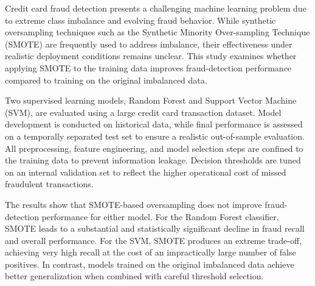 \documentclass[oneside,12pt,parskip=half,american,numbers=noenddot]{scrreprt}
\begin{document}
Credit card fraud detection presents a challenging machine learning problem due to extreme class imbalance and evolving fraud behavior. While synthetic oversampling techniques such as the Synthetic Minority Over-sampling Technique (SMOTE) are frequently used to address imbalance, their effectiveness under realistic deployment conditions remains unclear. This study examines whether applying SMOTE to the training data improves fraud-detection performance compared to training on the original imbalanced data.

Two supervised learning models, Random Forest and Support Vector Machine (SVM), are evaluated using a large credit card transaction dataset. Model development is conducted on historical data, while final performance is assessed on a temporally separated test set to ensure a realistic out-of-sample evaluation. All preprocessing, feature engineering, and model selection steps are confined to the training data to prevent information leakage. Decision thresholds are tuned on an internal validation set to reflect the higher operational cost of missed fraudulent transactions.

The results show that SMOTE-based oversampling does not improve fraud-detection performance for either model. For the Random Forest classifier, SMOTE leads to a substantial and statistically significant decline in fraud recall and overall performance. For the SVM, SMOTE produces an extreme trade-off, achieving very high recall at the cost of an impractically large number of false positives. In contrast, models trained on the original imbalanced data achieve better generalization when combined with careful threshold selection. 

\newpage

\renewcommand{\contentsname}{\textbf{Table of Contents}}
\tableofcontents
\thispagestyle{frontmatter}
\newpage

\renewcommand{\listtablename}{\textbf{List of Tables}}
\listoftables
\thispagestyle{frontmatter}
\newpage

\renewcommand{\listfigurename}{\textbf{List of Figures}}
\listoffigures
\thispagestyle{frontmatter}
\newpage

\setcounter{page}{1}
\end{document}
